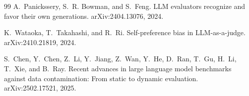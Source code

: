 \documentclass[11pt]{article}
\begin{document}
\begin{thebibliography}{99}
A.~Panickssery, S.~R. Bowman, and S.~Feng.
\newblock LLM evaluators recognize and favor their own generations.
\newblock arXiv:2404.13076, 2024.

K.~Wataoka, T.~Takahashi, and R.~Ri.
\newblock Self-preference bias in LLM-as-a-judge.
\newblock arXiv:2410.21819, 2024.

S.~Chen, Y.~Chen, Z.~Li, Y.~Jiang, Z.~Wan, Y.~He, D.~Ran, T.~Gu, H.~Li, T.~Xie, and B.~Ray.
\newblock Recent advances in large language model benchmarks against data contamination: From static to dynamic evaluation.
\newblock arXiv:2502.17521, 2025.

\end{thebibliography}
\end{document}
